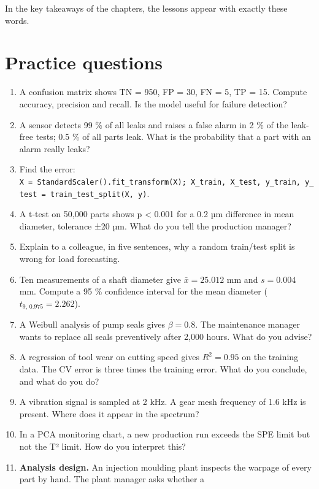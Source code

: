 \documentclass[
  letterpaper,
  DIV=11,
  numbers=noendperiod]{scrreprt}
\providecommand{\tightlist}{%
  \setlength{\itemsep}{0pt}\setlength{\parskip}{0pt}}\usepackage{longtable,booktabs,array}
\begin{document}
In the key takeaways of the chapters, the lessons appear with exactly
these words.

\section{Practice questions}\label{practice-questions}

\begin{enumerate}
\def\labelenumi{\arabic{enumi}.}
\tightlist
\item
  A confusion matrix shows TN = 950, FP = 30, FN = 5, TP = 15. Compute
  accuracy, precision and recall. Is the model useful for failure
  detection?
\item
  A sensor detects 99 \% of all leaks and raises a false alarm in 2 \%
  of the leak-free tests; 0.5 \% of all parts leak. What is the
  probability that a part with an alarm really leaks?
\item
  Find the error:
  \texttt{X\ =\ StandardScaler().fit\_transform(X);\ X\_train,\ X\_test,\ y\_train,\ y\_test\ =\ train\_test\_split(X,\ y)}.
\item
  A t-test on 50,000 parts shows p \textless{} 0.001 for a 0.2 µm
  difference in mean diameter, tolerance ±20 µm. What do you tell the
  production manager?
\item
  Explain to a colleague, in five sentences, why a random train/test
  split is wrong for load forecasting.
\item
  Ten measurements of a shaft diameter give \(\bar x = 25.012\) mm and
  \(s = 0.004\) mm. Compute a 95 \% confidence interval for the mean
  diameter (\(t_{9,\,0.975} = 2.262\)).
\item
  A Weibull analysis of pump seals gives \(\beta = 0.8\). The
  maintenance manager wants to replace all seals preventively after
  2,000 hours. What do you advise?
\item
  A regression of tool wear on cutting speed gives \(R^2 = 0.95\) on the
  training data. The CV error is three times the training error. What do
  you conclude, and what do you do?
\item
  A vibration signal is sampled at 2 kHz. A gear mesh frequency of 1.6
  kHz is present. Where does it appear in the spectrum?
\item
  In a PCA monitoring chart, a new production run exceeds the SPE limit
  but not the T² limit. How do you interpret this?
\item
  \textbf{Analysis design.} An injection moulding plant inspects the
  warpage of every part by hand. The plant manager asks whether a

\end{enumerate}
\end{document}
